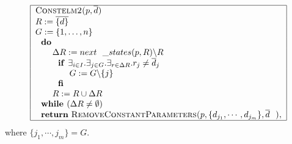 \documentclass{article}
\begin{document}
\[
\begin{tabular}{|l|}
\hline
\textsc{Constelm2(}$p,\overline{d}$\textsc{)} \\ 
$R:=\overline{\{d\}}$ \\ 
$G:=\{1,\ldots ,n\}$ \\ 
$\text{\textbf{do}}$ \\ 
$\qquad \Delta R:=next\_states(p,R)\backslash R$ \\ 
$\qquad \text{\textbf{if }}\exists _{i\in I}.\exists _{j\in G}.\exists
_{r\in \Delta R}.r_{j}\neq \overline{d}_{j}$ \\ 
$\qquad \qquad G:=G\backslash \{j\}$ \\ 
$\qquad \text{\textbf{fi}}$ \\ 
$\qquad R:=R\cup \Delta R$ \\ 
$\text{\textbf{while }}(\Delta R\neq \emptyset )$ \\ 
$\text{\textbf{return} \textsc{RemoveConstantParameters(}}%
p,\{d_{j_{1}},\cdots ,d_{j_{m}}\},\overline{d}\text{\textsc{)}},$ \\ \hline
\end{tabular}%
\]%
where $\{j_{1},\cdots ,j_{m}\}=G$.
\end{document}
